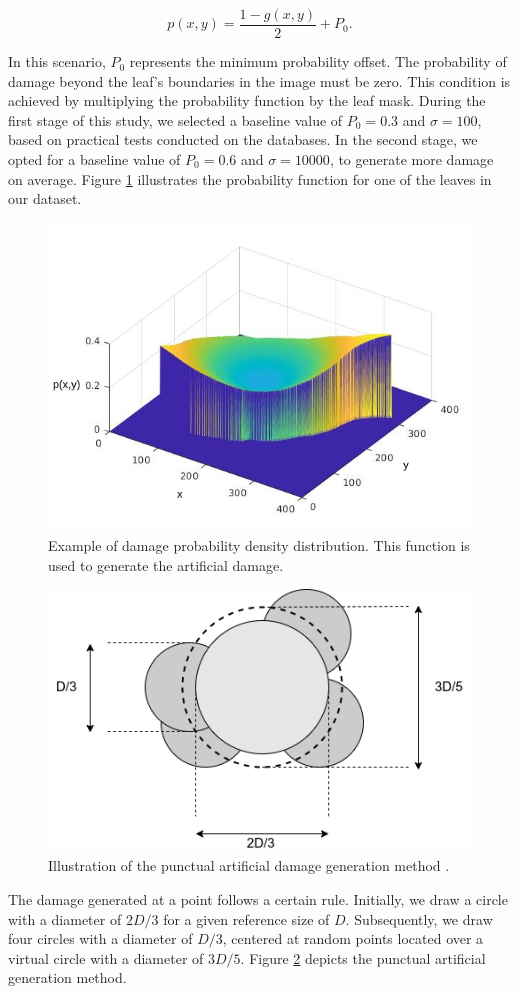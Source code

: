 \begin{equation}
    {p}(x,y) = \frac{1-g(x,y)}{2} + P_0.
\end{equation}

In this scenario, $P_0$ represents the minimum probability offset. The probability of damage beyond the leaf's boundaries in the image must be zero. This condition is achieved by multiplying the probability function by the leaf mask. During the first stage of this study, we selected a baseline value of $P_0 = 0.3$ and $\sigma = 100$, based on practical tests conducted on the databases. In the second stage, we opted for a baseline value of $P_0 = 0.6$ and $\sigma = 10000$, to generate more damage on average. Figure \ref{fig:leaf_pdf} illustrates the probability function for one of the leaves in our dataset.

\begin{figure}[h!]
    \centering
    \includegraphics[width = .55\linewidth]{Figures/leaf_pdf.png}
    \caption{Example of damage probability density distribution. This function is used to generate the artificial damage.}
    \label{fig:leaf_pdf}
\end{figure}

\begin{figure}[h!]
    \centering
    \includegraphics[width = .45\linewidth]{Figures/artificial-damage.png}
    \caption{Illustration of the punctual artificial damage generation method \cite{iceis21leaf}.}
    \label{fig:artificial-damage}
\end{figure}

The damage generated at a point follows a certain rule. Initially, we draw a circle with a diameter of $2D/3$ for a given reference size of $D$. Subsequently, we draw four circles with a diameter of $D/3$, centered at random points located over a virtual circle with a diameter of $3D/5$. Figure \ref{fig:artificial-damage} depicts the punctual artificial generation method.

